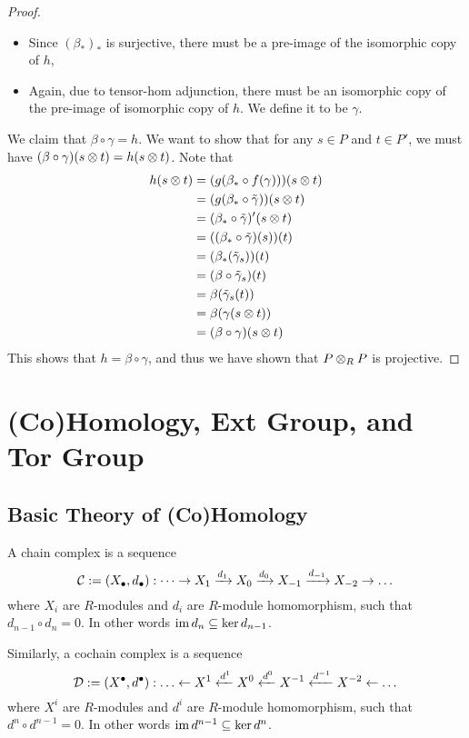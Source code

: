\begin{proof}
\begin{itemize}
        \item Since $(\beta_*)_*$ is surjective, there must be a pre-image of the isomorphic copy of $h$,
        \item Again, due to tensor-hom adjunction, there must be an isomorphic copy of the pre-image of isomorphic copy of $h$. We define it to be $\gamma$.
    \end{itemize}
    We claim that $\beta\circ \gamma = h$. We want to show that for any $s\in P$ and $t\in P'$, we must have $(\beta\circ\gamma)(s\otimes t) = h(s\otimes t)$. Note that 
    \begin{align*}
        h(s\otimes t)
        &= (g(\beta_* \circ f(\gamma)))(s\otimes t) \\
        &= (g(\beta_* \circ \tilde\gamma))(s\otimes t)\\
        &= (\beta_* \circ \tilde\gamma)'(s\otimes t)\\
        &= ((\beta_* \circ \tilde\gamma)(s)) (t) \\
        &= (\beta_* (\tilde\gamma_s))(t) \\
        &= (\beta\circ \tilde\gamma_s)(t) \\
        &= \beta(\tilde\gamma_s(t)) \\
        &= \beta(\gamma(s\otimes t)) \\
        &= (\beta\circ \gamma)(s\otimes t)
    \end{align*}
    This shows that $h= \beta\circ \gamma$, and thus we have shown that $P\otimes_R P$ is projective.
\end{proof}

\newpage
\section{(Co)Homology, Ext Group, and Tor Group}
\subsection{Basic Theory of (Co)Homology}

\begin{defn}
    A chain complex is a sequence
    \[\mathcal C := (X_{\bullet}, d_\bullet):\dots \to X_1 \xrightarrow{d_1} X_0 \xrightarrow{d_0} X_{-1} \xrightarrow{d_{-1}} X_{-2} \to \dots\]
    where $X_i$ are $R$-modules and $d_i$ are $R$-module homomorphism, such that $d_{n-1}\circ d_n = 0$. In other words $\operatorname{im} d_n \subseteq \ker d_{n-1}$.

    Similarly, a cochain complex is a sequence 
    \[\mathcal D:=(X^{\bullet}, d^\bullet):\dots \ot X^1 \xot {d^1} X^0 \xot{d^0} X^{-1} \xot{d^{-1}} X^{-2} \ot \dots\]
    where $X^i$ are $R$-modules and $d^i$ are $R$-module homomorphism, such that $d^{n}\circ d^{n-1} = 0$. In other words $\operatorname{im} d^{n-1} \subseteq \ker d^{n}$.
\end{defn}

